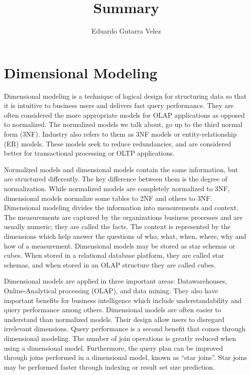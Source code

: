 \documentclass[]{article}
\title{Summary}
\author{Eduardo Gutarra Velez}
\begin{document}
\ifpdf
{}
\else
{}
\fi

\maketitle

\section{Dimensional Modeling} %
\label{sec:dimensional_modeling}

Dimensional modeling is a technique of logical design for structuring data so that it is intuitive to business users and delivers fast
query performance. They are often considered the more appropriate models for OLAP applications as opposed to normalized. The normalized
models we talk about, go up to the third normal form (3NF). Industry also refers to them as 3NF models or entity-relationship (ER)
models. These models seek to reduce redundancies, and are considered better for transactional processing or OLTP applications.

Normalized models and dimensional models contain the same information, but are structured differently. The key difference between them
is the degree of normalization. While normalized models are completely normalized to 3NF, dimensional models normalize some tables to
2NF and others to 3NF. Dimensional modeling divides the information into measurements and context. The measurements are captured by the
organizations business processes and are usually numeric; they are called the facts. The context is represented by the dimensions which
help answer the questions of who, what, when, where, why and how of a measurement. Dimensional models may be stored as star schemas or
cubes. When stored in a relational database platform, they are called star schemas, and when stored in an OLAP structure they are called
cubes.

Dimensional models are applied in three important areas: Datawarehouses, Online-Analytical processing (OLAP), and data mining. They also
have important benefits for business intelligence which include understandability and query performance among others. Dimensional models
are often easier to understand than normalized models. Their design allow users to disregard irrelevant dimensions. Query performance is
a second benefit that comes through dimensional modeling. The number of join operations is greatly reduced when using a dimensional
model. Furthermore, the query plan can be improved through joins performed in a dimensional model, known as ``star joins''. Star joins
may be performed faster through indexing or result set size prediction.
\end{document}
